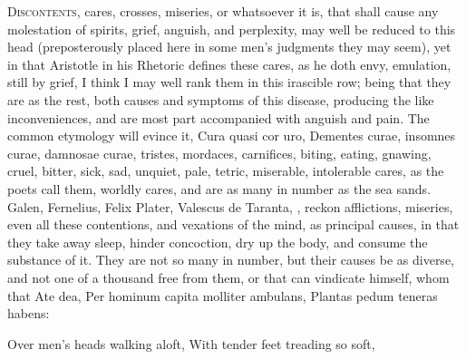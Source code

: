 {\lettrine{D}{iscontents}, cares, crosses, miseries, or whatsoever it is, that shall
cause any molestation of spirits, grief, anguish, and perplexity, may
well be reduced to this head (preposterously placed here in some men's
judgments they may seem), yet in that Aristotle in his Rhetoric
defines these cares, as he doth envy, emulation, \etc{} still by grief, I
think I may well rank them in this irascible row; being that they are
as the rest, both causes and symptoms of this disease, producing the
like inconveniences, and are most part accompanied with anguish and
pain. The common etymology will evince it, Cura quasi cor uro, Dementes
curae, insomnes curae, damnosae curae, tristes, mordaces, carnifices,
\etc{} biting, eating, gnawing, cruel, bitter, sick, sad, unquiet, pale,
tetric, miserable, intolerable cares, as the poets call them,
worldly cares, and are as many in number as the sea sands. Galen,
Fernelius, Felix Plater, Valescus de Taranta, \etc{}, reckon afflictions,
miseries, even all these contentions, and vexations of the mind, as
principal causes, in that they take away sleep, hinder concoction, dry
up the body, and consume the substance of it. They are not so many in
number, but their causes be as diverse, and not one of a thousand free
from them, or that can vindicate himself, whom that Ate dea,
Per hominum capita molliter ambulans,
Plantas pedum teneras habens:

Over men's heads walking aloft,
With tender feet treading so soft,

}
